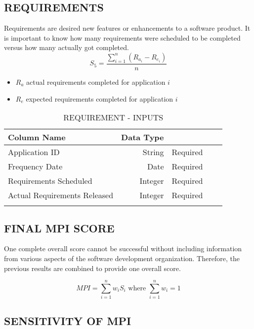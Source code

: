 \documentclass[SDSUThesis.tex]{subfiles}
\begin{document}
\subsection{REQUIREMENTS}
Requirements are desired new features or enhancements to a software product.  It is important to know how many requirements
were scheduled to be completed versus how many actually got completed.  
\[
    S_5 = \frac{\sum^n_{i=1}\left( R_{a_i} - R_{e_i} \right)}{n}
\]
\begin{itemize}
\item $R_a$ actual requirements completed for application $i$
\item $R_e$ expected requirements completed for application $i$
\end{itemize}

\begin{longtable}{@{}l rr rr}

\toprule%
 \centering%
 {\bfseries Column Name}
 & {\bfseries Data Type}
 &  \\

\cmidrule[0.4pt](r{0.125em}){1-1}%
\cmidrule[0.4pt](lr{0.125em}){2-2}%
\cmidrule[0.4pt](l{0.125em}){3-3}%
\endhead

Application ID & String  & Required \\
\myrowcolour%
Frequency Date & Date & Required \\
Requirements Scheduled & Integer & Required \\
\myrowcolour%
Actual Requirements Released & Integer  & Required \\

\bottomrule

\caption{REQUIREMENT - INPUTS}
\label{tab:req}
\end{longtable}

\subsection{FINAL MPI SCORE}
One complete overall score cannot be successful without including information from various aspects of the software development organization.  Therefore, the previous results
are combined to provide one overall score.

\[
    MPI =\sum\limits^n_{i=1} w_i S_i \text{ where } \sum\limits^n_{i=1} w_i = 1
\]


\subsection{SENSITIVITY OF MPI}
\label{sub:sensitivity}
\end{document}
